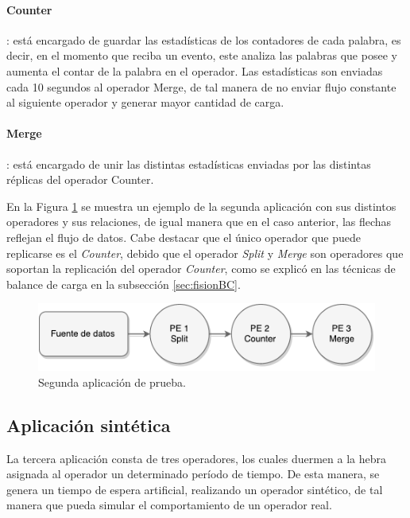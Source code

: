 \paragraph{Counter}: está encargado de guardar las estadísticas de los contadores de cada palabra, es decir, en el momento que reciba un evento, este analiza las palabras que posee y aumenta el contar de la palabra en el operador. Las estadísticas son enviadas cada 10 segundos al operador Merge, de tal manera de no enviar flujo constante al siguiente operador y generar mayor cantidad de carga.

\paragraph{Merge}: está encargado de unir las distintas estadísticas enviadas por las distintas réplicas del operador Counter.

En la Figura \ref{fig:segundaAplicacion} se muestra un ejemplo de la segunda aplicación con sus distintos operadores y sus relaciones, de igual manera que en el caso anterior, las flechas reflejan el flujo de datos. Cabe destacar que el único operador que puede replicarse es el \textit{Counter}, debido que el operador \textit{Split} y \textit{Merge} son operadores que soportan la replicación del operador \textit{Counter}, como se explicó en las técnicas de balance de carga en la subsección \ref{sec:fisionBC}.

\begin{figure}[!hb]
	\centering
		\includegraphics[scale=0.75]{images/App2.pdf}
	\caption{Segunda aplicación de prueba.}
	\label{fig:segundaAplicacion}
\end{figure}

\subsection{Aplicación sintética}
La tercera aplicación consta de tres operadores, los cuales duermen a la hebra asignada al operador un determinado período de tiempo. De esta manera, se genera un tiempo de espera artificial, realizando un operador sintético, de tal manera que pueda simular el comportamiento de un operador real.

